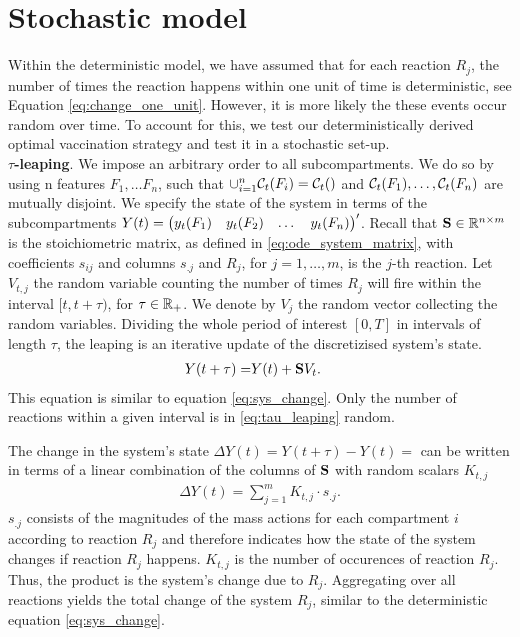 \section{Stochastic model}
\label{sec:stochastic}
Within the deterministic model, we have assumed that for each reaction $R_j$, the number of times the reaction happens within one unit of time is deterministic, see Equation \eqref{eq:change_one_unit}. However, it is more likely the these events occur random over time. To account for this, we test our deterministically derived optimal vaccination strategy and test it in a stochastic set-up. \\

\textbf{$\tau$-leaping}. We impose an arbitrary order to all subcompartments. We do so by using n features $F_1, \dots F_n$, such that $\cup_{i=1}^n \mathcal{C}_t(F_i) = \mathcal{C}_t()$ and $\mathcal{C}_t(F_1), \dots, \mathcal{C}_t(F_n)$ are mutually disjoint. We specify the state of the system in terms of the subcompartments $Y(t) = \begin{pmatrix} y_t(F_1) & y_t(F_2) & \dots & y_t(F_n)\end{pmatrix}'$. Recall that $\mathbf{S} \in \mathbb{R}^{n \times m}$ is the stoichiometric matrix, as defined in \eqref{eq:ode_system_matrix}, with coefficients $s_{ij}$ and columns $s_{.j}$ and $R_j$, for $j=1, \dots, m$, is the $j$-th reaction. Let $V_{t,j}$ the random variable counting the number of times $R_j$ will fire within the interval $[t, t + \tau)$, for $\tau \in \mathbb{R}_+$. We denote by $V_j$ the random vector collecting the random variables. Dividing the whole period of interest $[0, T]$ in intervals of length $\tau$, the leaping is an iterative update of the discretizised system's state.
\begin{align}
\label{eq:tau_leaping}
Y(t + \tau) =& Y(t) + \mathbf{S} V_t.
\end{align}
This equation is similar to equation \eqref{eq:sys_change}. Only the number of reactions within a given interval is in \eqref{eq:tau_leaping} random. 

The change in the system's state $\Delta Y(t) = Y(t + \tau) - Y(t)=$ can be written in terms of a linear combination of the columns of $\mathbf{S}$ with random scalars $K_{t,j}$
\begin{align}
\Delta Y(t) = \sum_{j=1}^m K_{t,j} \cdot s_{.j}.
\end{align}
$s_{.j}$ consists of the magnitudes of the mass actions for each compartment $i$ according to reaction $R_j$ and therefore indicates how the state of the system changes if reaction $R_j$ happens. $K_{t,j}$ is the number of occurences of reaction $R_j$. Thus, the product is the system's change due to $R_j$. Aggregating over all reactions yields the total change of the system $R_j$, similar to the deterministic equation \eqref{eq:sys_change}.\\  

